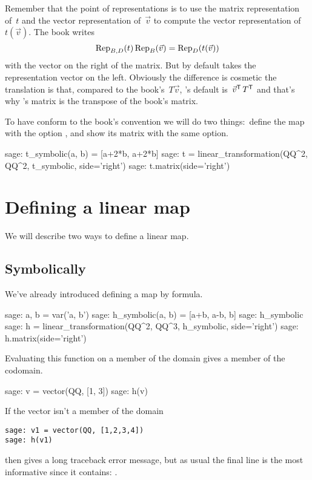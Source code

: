 Remember that the point of representations is to
use the matrix representation of~$t$ and the vector representation of~$\vec{v}$ 
to compute
the vector representation of~$t(\vec{v})$.
The book writes
\begin{equation*}
  \rep{t}{B,D}\,\rep{\vec{v}}{B}=\rep{t(\vec{v})}{D}
\end{equation*}
with the vector on the right of the matrix.
But \Sage{} by default takes 
the representation vector on the left.
Obviously the difference is cosmetic\Dash
the translation is that, compared to the book's~$T\vec{v}$,
\Sage{}'s default is~$\trans{\vec{v}}\,\trans{T}$\Dash
and that's why \Sage{}'s matrix is the transpose of the book's matrix.

To have \Sage{} conform to the book's convention we will do two 
things:~define the map with the
option , and show its
matrix with the same option.
\begin{sagecommandline}
sage: t_symbolic(a, b) = [a+2*b, a+2*b]         
sage: t = linear_transformation(QQ^2, QQ^2, t_symbolic, side='right')  
sage: t.matrix(side='right')
\end{sagecommandline}


  

\section{Defining a linear map}
We will describe two ways to 
define a linear map.

\subsection{Symbolically}
We've already introduced defining a map by formula.
\begin{sagecommandline}
sage: a, b = var('a, b')   
sage: h_symbolic(a, b) = [a+b, a-b, b]         
sage: h_symbolic       
sage: h = linear_transformation(QQ^2, QQ^3, h_symbolic, side='right')
sage: h.matrix(side='right') 
\end{sagecommandline}
Evaluating this function on a member of the domain gives a member
of the codomain. 
\begin{sagecommandline}
sage: v = vector(QQ, [1, 3])  
sage: h(v)
\end{sagecommandline}

If the vector isn't a member of the domain
\begin{lstlisting}
sage: v1 = vector(QQ, [1,2,3,4])
sage: h(v1)
\end{lstlisting}
then \Sage{} gives a long traceback error message, but as usual the final line 
is the most informative since it contains:
.

